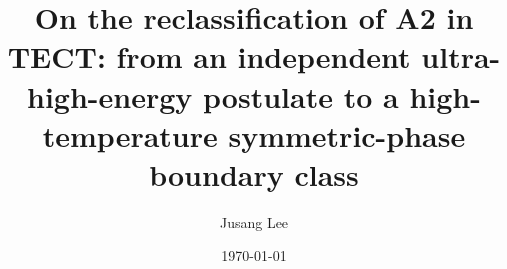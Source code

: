 



\title{On the reclassification of A2 in TECT: from an independent
ultra-high-energy postulate to a high-temperature symmetric-phase
boundary class}

\author{Jusang Lee}

\date{\today}

